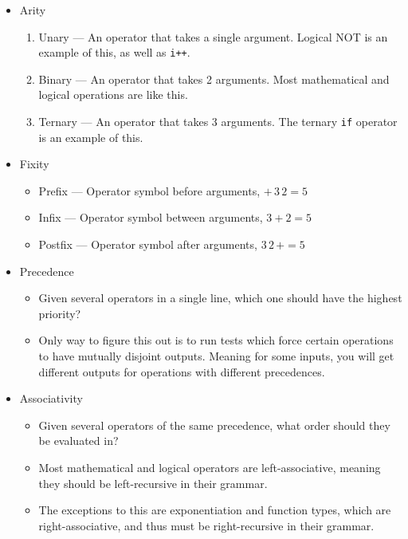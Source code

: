\begin{itemize}
\item Arity
  \begin{enumerate}[noitemsep]
  \item Unary --- An operator that takes a single argument. Logical NOT is an example of this, as well as \texttt{i++}.
  \item Binary --- An operator that takes 2 arguments. Most mathematical and logical operations are like this.
  \item Ternary --- An operator that takes 3 arguments. The ternary \texttt{if} operator is an example of this.
  \end{enumerate}

\item Fixity
  \begin{itemize}[noitemsep]
  \item Prefix --- Operator symbol before arguments, $+\, 3\, 2 = 5$
  \item Infix --- Operator symbol between arguments, $3 + 2 = 5$
  \item Postfix --- Operator symbol after arguments, $3\, 2\, + = 5$
  \end{itemize}

\item Precedence
  \begin{itemize}[noitemsep]
  \item Given several operators in a single line, which one should have the highest priority?
  \item Only way to figure this out is to run tests which force certain operations to have mutually disjoint outputs. Meaning for some inputs, you will get different outputs for operations with different precedences.
  \end{itemize}

\item Associativity
  \begin{itemize}[noitemsep]
  \item Given several operators of the same precedence, what order should they be evaluated in?
  \item Most mathematical and logical operators are left-associative, meaning they should be left-recursive in their grammar.
  \item The exceptions to this are exponentiation and function types, which are right-associative, and thus must be right-recursive in their grammar.
  \end{itemize}
\end{itemize}

